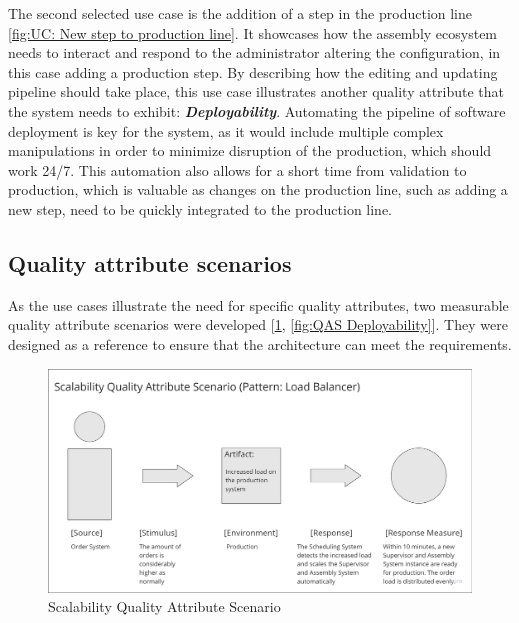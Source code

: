 \documentclass[conference]{IEEEtran}
\begin{document}
The second selected use case is the addition of a step in the production line \ref{fig:UC: New step to production line}. It showcases how the assembly ecosystem needs to interact and respond to the administrator altering the configuration, in this case adding a production step. By describing how the editing and updating pipeline should take place, this use case illustrates another quality attribute that the system needs to exhibit: \textbf{\textit{Deployability}}. Automating the pipeline of software deployment is key for the system, as it would include multiple complex manipulations in order to minimize disruption of the production, which should work 24/7. This automation also allows for a short time from validation to production, which is valuable as changes on the production line, such as adding a new step, need to be quickly integrated to the production line.


\subsection{Quality attribute scenarios}
\label{sec:qas}

As the use cases illustrate the need for specific quality attributes, two measurable quality attribute scenarios were developed [\ref{fig:QAS Scalability}, \ref{fig:QAS Deployability}]. They were designed as a reference to ensure that the architecture can meet the requirements.

\begin{figure}
    \centering
    \includegraphics[width=0.9\linewidth]{img/QAS Scalability.png}
    \caption{Scalability Quality Attribute Scenario}
    \label{fig:QAS Scalability}
\end{figure}
\end{document}
